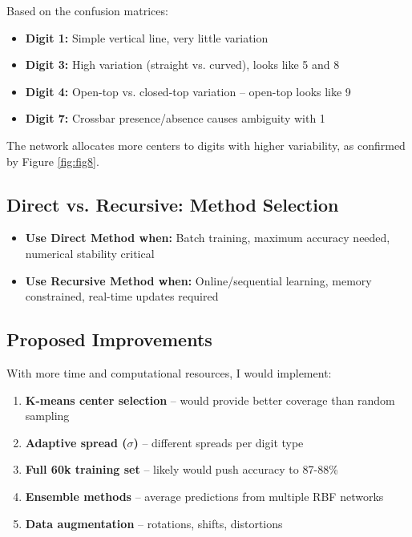 \documentclass[12pt]{article}
\begin{document}
	Based on the confusion matrices:
	
	\begin{itemize}
		\item \textbf{Digit 1:} Simple vertical line, very little variation
		\item \textbf{Digit 3:} High variation (straight vs. curved), looks like 5 and 8
		\item \textbf{Digit 4:} Open-top vs. closed-top variation – open-top looks like 9
		\item \textbf{Digit 7:} Crossbar presence/absence causes ambiguity with 1
	\end{itemize}
	
	The network allocates more centers to digits with higher variability, as confirmed by Figure \ref{fig:fig8}.
	
	\subsection{Direct vs. Recursive: Method Selection}
	
	\begin{itemize}
		\item \textbf{Use Direct Method when:} Batch training, maximum accuracy needed, numerical stability critical
		\item \textbf{Use Recursive Method when:} Online/sequential learning, memory constrained, real-time updates required
	\end{itemize}
	
	\subsection{Proposed Improvements}
	
	With more time and computational resources, I would implement:
	
	\begin{enumerate}
		\item \textbf{K-means center selection} – would provide better coverage than random sampling
		\item \textbf{Adaptive spread ($\sigma$)} – different spreads per digit type
		\item \textbf{Full 60k training set} – likely would push accuracy to 87-88\%
		\item \textbf{Ensemble methods} – average predictions from multiple RBF networks
		\item \textbf{Data augmentation} – rotations, shifts, distortions
	\end{enumerate}
	
\end{document}
